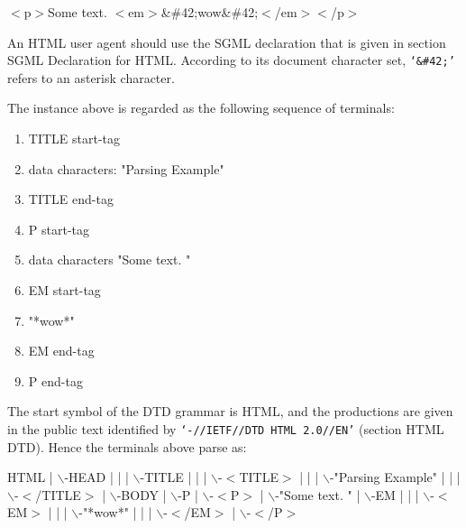 $<$p$>$Some text. $<$em$>$\&\#42;wow\&\#42;$<$/em$>$$<$/p$>$
\par 
An HTML user agent should use the SGML declaration that is given in
section SGML Declaration for HTML.  According to its document character set,
{\tt `\&\#42;'} refers to an asterisk character.
\par \par 
The instance above is regarded as the following sequence of terminals:
\par \begin{enumerate}\item 
TITLE start-tag
\item 
data characters:  "Parsing Example"
\item 
TITLE end-tag
\item 
P start-tag
\item 
data characters "Some text.  "
\item 
EM start-tag
\item 
"*wow*"
\item 
EM end-tag
\item 
P end-tag
\end{enumerate}\par 
The start symbol of the DTD grammar is HTML, and the productions
are given in the public text identified by {\tt `-//IETF//DTD HTML 2.0//EN'} (section HTML DTD).  Hence the terminals above parse as:
\par    HTML
    |
    $\backslash$-HEAD
    |  |
    |  $\backslash$-TITLE
    |      |
    |      $\backslash$-$<$TITLE$>$
    |      |
    |      $\backslash$-"Parsing Example"
    |      |
    |      $\backslash$-$<$/TITLE$>$
    |
    $\backslash$-BODY
      |
      $\backslash$-P
        |
        $\backslash$-$<$P$>$
        |
        $\backslash$-"Some text. "
        |
        $\backslash$-EM
        |  |
        |  $\backslash$-$<$EM$>$
        |  |
        |  $\backslash$-"*wow*"
        |  |
        |  $\backslash$-$<$/EM$>$
        | 
        $\backslash$-$<$/P$>$
